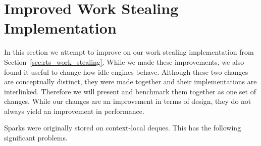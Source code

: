 
\section{Improved Work Stealing Implementation}
\label{sec:rts_work_stealing2}

In this section we attempt to improve on our work stealing
implementation from Section~\ref{sec:rts_work_stealing}.
While we made these improvements,
we also found it useful to change how idle engines behave.
Although these two changes are conceptually distinct,
they were made together and their implementations are interlinked.
Therefore we will present and benchmark them together as one set of changes.
While our changes are an improvement in terms of design,
they do not always yield an improvement in performance.

Sparks were originally stored on context-local deques.
This has the following significant problems.

